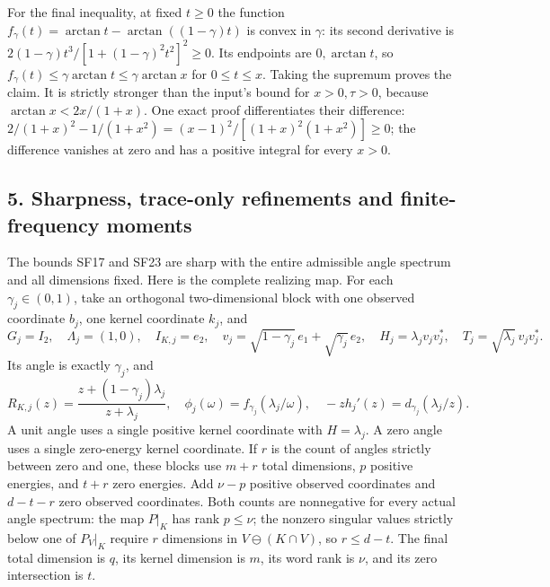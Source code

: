 \documentclass[10pt]{article}
\begin{document}
For the final inequality, at fixed \(t\ge0\) the function \(f_\gamma(t)=\arctan t-\arctan((1-\gamma)t)\) is convex in \(\gamma\): its second derivative is \(2(1-\gamma)t^3/[1+(1-\gamma)^2t^2]^2\ge0\). Its endpoints are \(0,\arctan t\), so \(f_\gamma(t)\le\gamma\arctan t\le\gamma\arctan x\) for \(0\le t\le x\). Taking the supremum proves the claim. It is strictly stronger than the input's bound for \(x>0,\tau>0\), because \(\arctan x<2x/(1+x)\). One exact proof differentiates their difference: \(2/(1+x)^2-1/(1+x^2)=(x-1)^2/[(1+x)^2(1+x^2)]\ge0\); the difference vanishes at zero and has a positive integral for every \(x>0\).

\subsection{5. Sharpness, trace-only refinements and finite-frequency moments}\label{sharpness-trace-only-refinements-and-finite-frequency-moments}

The bounds SF17 and SF23 are sharp with the entire admissible angle spectrum and all dimensions fixed. Here is the complete realizing map. For each \(\gamma_j\in(0,1)\), take an orthogonal two-dimensional block with one observed coordinate \(b_j\), one kernel coordinate \(k_j\), and \[
 G_j=I_2,\quad \Lambda_j=(1,0),\quad I_{K,j}=e_2,\quad
 v_j=\sqrt{1-\gamma_j}\,e_1+\sqrt{\gamma_j}\,e_2,\quad
 H_j=\lambda_jv_jv_j^*,\quad T_j=\sqrt{\lambda_j}\,v_jv_j^* .
 \tag{SF25}
\] Its angle is exactly \(\gamma_j\), and \[
 R_{K,j}(z)=\frac{z+(1-\gamma_j)\lambda_j}{z+\lambda_j},\quad
 \phi_j(\omega)=f_{\gamma_j}(\lambda_j/\omega),\quad
 -zh_j'(z)=d_{\gamma_j}(\lambda_j/z).
 \tag{SF26}
\] A unit angle uses a single positive kernel coordinate with \(H=\lambda_j\). A zero angle uses a single zero-energy kernel coordinate. If \(r\) is the count of angles strictly between zero and one, these blocks use \(m+r\) total dimensions, \(p\) positive energies, and \(t+r\) zero energies. Add \(\nu-p\) positive observed coordinates and \(d-t-r\) zero observed coordinates. Both counts are nonnegative for every actual angle spectrum: the map \(P|_K\) has rank \(p\le\nu\); the nonzero singular values strictly below one of \(P_V|_K\) require \(r\) dimensions in \(V\ominus(K\cap V)\), so \(r\le d-t\). The final total dimension is \(q\), its kernel dimension is \(m\), its word rank is \(\nu\), and its zero intersection is \(t\).
\end{document}
